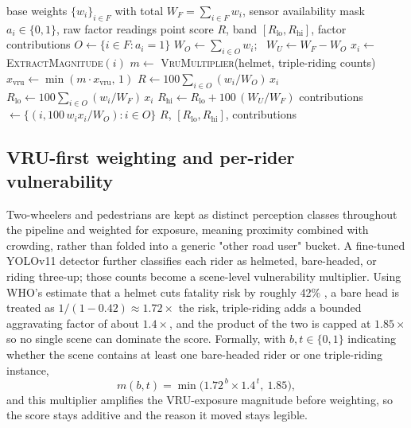 \documentclass[journal]{IEEEtran}
\begin{document}
\begin{algorithm}[t]
\caption{Observability-aware risk fusion}
\label{alg:fusion}
\begin{algorithmic}[1]
\Require base weights $\{w_i\}_{i\in F}$ with total $W_F = \sum_{i\in F} w_i$, sensor availability mask $a_i \in \{0,1\}$, raw factor readings
\Ensure point score $R$, band $[R_{\mathrm{lo}}, R_{\mathrm{hi}}]$, factor contributions
\State $O \gets \{ i \in F : a_i = 1 \}$
\State $W_O \gets \sum_{i \in O} w_i$; \ $W_U \gets W_F - W_O$
  \State $x_i \gets$ \textsc{ExtractMagnitude}$(i)$ 
\EndFor
\State $m \gets$ \textsc{VruMultiplier}(helmet, triple-riding counts) 
\State $x_{\mathrm{vru}} \gets \min(m \cdot x_{\mathrm{vru}},\, 1)$ 
\State $R \gets 100 \sum_{i \in O} (w_i / W_O)\, x_i$
\State $R_{\mathrm{lo}} \gets 100 \sum_{i \in O} (w_i / W_F)\, x_i$
\State $R_{\mathrm{hi}} \gets R_{\mathrm{lo}} + 100\,(W_U / W_F)$
\State contributions $\gets \{ (i, 100\, w_i x_i / W_O) : i \in O \}$
\State \Return $R$, $[R_{\mathrm{lo}}, R_{\mathrm{hi}}]$, contributions
\end{algorithmic}
\end{algorithm}

\subsection{VRU-first weighting and per-rider vulnerability}

Two-wheelers and pedestrians are kept as distinct perception classes throughout the pipeline and weighted for exposure, meaning proximity combined with crowding, rather than folded into a generic "other road user" bucket. A fine-tuned YOLOv11 detector further classifies each rider as helmeted, bare-headed, or riding three-up; those counts become a scene-level vulnerability multiplier. Using WHO's estimate that a helmet cuts fatality risk by roughly 42\% \cite{who2006}, a bare head is treated as $1/(1-0.42) \approx 1.72\times$ the risk, triple-riding adds a bounded aggravating factor of about $1.4\times$, and the product of the two is capped at $1.85\times$ so no single scene can dominate the score. Formally, with $b, t \in \{0,1\}$ indicating whether the scene contains at least one bare-headed rider or one triple-riding instance,
\begin{equation}
m(b,t) = \min\!\big(1.72^{\,b} \times 1.4^{\,t},\ 1.85\big),
\label{eq:vru-mult}
\end{equation}
and this multiplier amplifies the VRU-exposure magnitude before weighting, so the score stays additive and the reason it moved stays legible.
\end{document}
